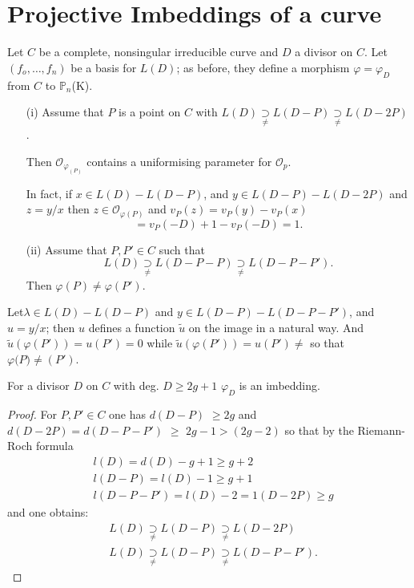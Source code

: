 \section{Projective Imbeddings of a curve}\label{chap2:sec3}%

Let $C$  be a  complete, nonsingular irreducible curve and $D$  a
divisor on $C$. Let $(f_o,\ldots,f_n)$ be a basis for $L(D)$; as
before, they define a morphism $\varphi =\varphi_D $ from $C$ to
$\mathbb{P}_n $(K). 
\begin{enumerate}
\item [(i)] Assume that $P$ is a point on $C$ with $ L(D)
  \underset{\neq} \supset L(D-P) \underset{\neq} \supset L(D-2P)$. 

  Then $\mathscr{O}_{\varphi _(P)}$ contains a uniformising parameter
  for $\mathscr{O}_p$. 

  In fact, if $ x \in L (D)-L (D-P)$, and  $y \in L(D-P)-L (D-2P)$
  and $z= y/x$ then $z \in \mathscr{O}_{\varphi (P)}$ and $v_P (z)=v_P
  (y)-v_P(x)$ 
  $$
  = v_P (-D)+1-v_P (-D)=1.
  $$
\item[(ii)] Assume that $P,P'\in C$ such that
  $$
  L(D)\underset{\neq}{\supset} L(D-P-P)\underset{\neq}{\supset} L(D-P-P').
  $$
  Then $ \varphi (P)\neq \varphi (P')$.
\end{enumerate}

Let\pageoriginale $\lambda \in L(D) - L(D-P)$ and $y \in L(D-P) - L(D-P-P')$, and
$u=y/x$; then $u$ defines a function $\tilde{u}$ on the image in a
natural way. And $\tilde{u} (\varphi (P'))= u(P') = 0 $ while
$\tilde{u} (\varphi (P'))= u(P') \ne $ so that $\varphi({ P)
  \ne(P')}$. 

\begin{theorem*}%
  For a divisor $D$ on $C$ with deg. $D \geq 2g+1$
  $\varphi_{D}$ is an imbedding.	 
\end{theorem*}	

\begin{proof}%
  For $P,P' \in C$ one has $d(D-P)$ $\geq 2g$ and $d(D-2P) =
  d(D-P-P')$ $\geq$ $2g-1 > (2g-2)$ so that by the Riemann-Roch
  formula 
  \begin{align*}
    & l ( D) = d(D) - g + 1 \geq g+2\\
    & l ( D-P) = l(D) - 1 \geq g+1\\
    & l ( D-P-P') = l(D) - 2 = 1(D-2P) \geq g
  \end{align*}	
  and one obtains:
  \begin{align*}
    & L( D)\underset{\neq}{\supset} L(D-P) \underset{\neq}{\supset}
    L(D-2P)\\ 
    & L( D)\underset{\neq}{\supset} L(D-P) \underset{\neq}{\supset}
    L(D-P-P'). 
  \end{align*}
\end{proof}

